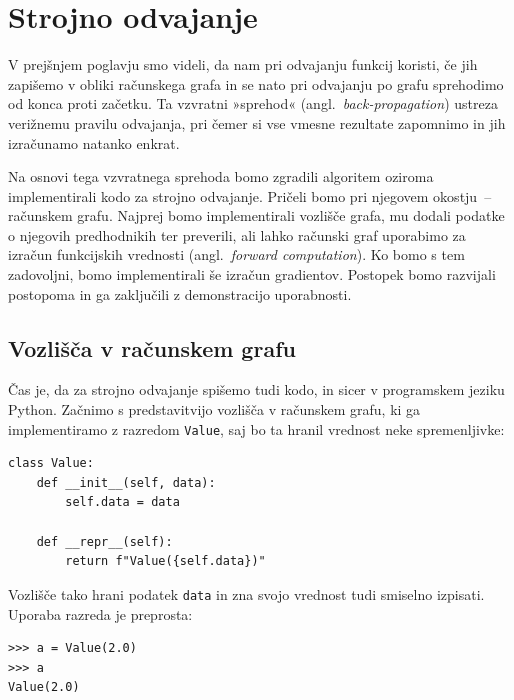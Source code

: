 \chapter{Strojno odvajanje}

V prejšnjem poglavju smo videli, da nam pri odvajanju funkcij koristi, 
če jih zapišemo v obliki računskega grafa in se nato pri odvajanju 
po grafu sprehodimo od konca proti začetku. Ta vzvratni »sprehod« 
(angl.\ \emph{back-propagation}) ustreza verižnemu pravilu odvajanja, 
pri čemer si vse vmesne rezultate zapomnimo in jih izračunamo natanko enkrat.

Na osnovi tega vzvratnega sprehoda bomo zgradili algoritem oziroma 
implementirali kodo za strojno odvajanje. Pričeli bomo pri njegovem 
okostju~-- računskem grafu. Najprej bomo implementirali vozlišče grafa, 
mu dodali podatke o njegovih predhodnikih ter preverili, ali lahko 
računski graf uporabimo za izračun funkcijskih vrednosti 
(angl.\ \emph{forward computation}). Ko bomo s tem zadovoljni, 
bomo implementirali še izračun gradientov. Postopek bomo razvijali 
postopoma in ga zaključili z demonstracijo uporabnosti.

\section{Vozlišča v računskem grafu}

Čas je, da za strojno odvajanje spišemo tudi kodo, in sicer v programskem
jeziku Python. Začnimo s predstavitvijo vozlišča v računskem grafu, ki ga
implementiramo z razredom \texttt{Value}, saj bo ta hranil vrednost neke
spremenljivke:

\vspace*{3mm}
\begin{lstlisting}
class Value:
    def __init__(self, data):
        self.data = data

    def __repr__(self):
        return f"Value({self.data})"
\end{lstlisting}

Vozlišče tako hrani podatek \texttt{data} in zna svojo vrednost tudi
smiselno izpisati. Uporaba razreda je preprosta:

\vspace*{3mm}
\begin{lstlisting}
>>> a = Value(2.0)
>>> a
Value(2.0)
\end{lstlisting}

